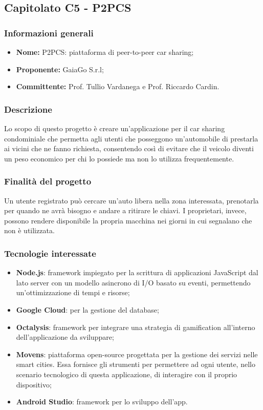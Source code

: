 \subsection{Capitolato C5 - P2PCS}
\subsubsection{Informazioni generali}
\begin{itemize}
\item \textbf{Nome:} P2PCS: piattaforma di peer-to-peer car sharing;
\item \textbf{Proponente:} GaiaGo S.r.l;
\item \textbf{Committente:} Prof. Tullio Vardanega e Prof. Riccardo Cardin.
\end{itemize}
\subsubsection{Descrizione}
Lo scopo di questo progetto è creare un'applicazione per il car sharing 
condominiale che permetta agli utenti che posseggono un'automobile di prestarla 
ai vicini che ne fanno richiesta, consentendo così di evitare che il veicolo 
diventi un peso economico per chi lo possiede ma non lo utilizza frequentemente.

\subsubsection{Finalità del progetto}
Un utente registrato può cercare un'auto libera nella zona interessata, 
prenotarla per quando ne avrà bisogno e andare a ritirare le chiavi. I 
proprietari, invece, possono rendere disponibile la propria macchina nei giorni in cui segnalano che non è utilizzata.

\subsubsection{Tecnologie interessate}
\begin{itemize}
	\item \textbf{Node.js}: framework impiegato per la scrittura di applicazioni 
JavaScript dal lato server con un modello asincrono di I/O basato su eventi, 
permettendo un'ottimizzazione di tempi e risorse;
	\item \textbf{Google Cloud}: per la gestione del database;
	\item \textbf{Octalysis}: framework per integrare una strategia di gamification\glo{} all'interno dell'applicazione da sviluppare;
	\item \textbf{Movens}: piattaforma open-source progettata per la gestione dei servizi nelle smart cities. Essa fornisce gli strumenti per permettere ad ogni	utente, nello scenario tecnologico di questa applicazione, di interagire con il proprio dispositivo;
	\item \textbf{Android Studio}: framework per lo sviluppo dell'app.
\end{itemize}

